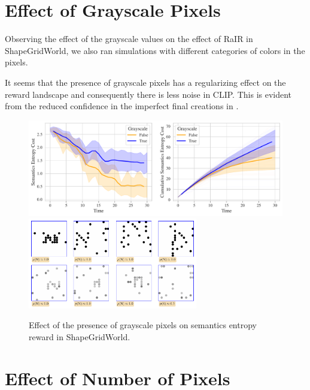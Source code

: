 \section{Effect of Grayscale Pixels}
\label{sec:sgw-grayscale}
Observing the effect of the grayscale values on the effect of RaIR in ShapeGridWorld, we also ran simulations with different categories of colors in the pixels.

It seems that the presence of grayscale pixels has a regularizing effect on the reward landscape and consequently there is less noise in CLIP.
This is evident from the reduced confidence in the imperfect final creations in .

\begin{figure}[h]
    \centering
    \includegraphics[width=\textwidth]{images/mode_comparison_sgw.pdf}
    \vspace{12pt}
    \includegraphics[width=0.66\textwidth]{images/mode_samples_sgw.pdf}
    \caption{Effect of the presence of grayscale pixels on semantics entropy reward in ShapeGridWorld.}
    \label{fig:mode-sgw}
\end{figure}

\section{Effect of Number of Pixels}
\label{sec:sgw-pixels}

